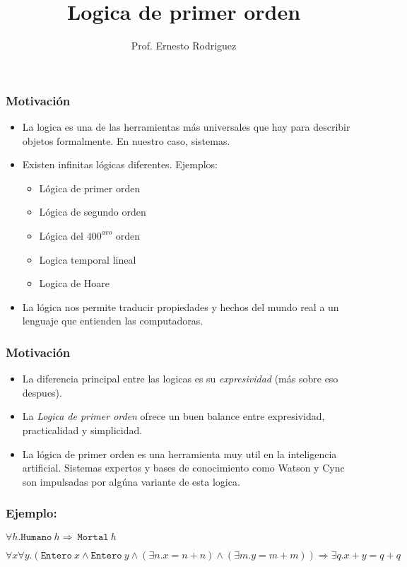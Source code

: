 \documentclass{beamer}
\title{Logica de primer orden}
\author{Prof. Ernesto Rodriguez}
\institute{
    Universidad del Itsmo \\
    \medskip \textit{erodriguez@unis.edu.gt}
}
\date[\today]{}
\begin{document}
\begin{frame}
\titlepage
\end{frame}

\begin{frame}
    \frametitle{Motivaci\'on}
    \begin{itemize}
        \item{La logica es una de las herramientas m\'as universales que hay
        para describir objetos formalmente. En nuestro caso, sistemas.}
        \item{Existen infinitas l\'ogicas diferentes. Ejemplos:
            \begin{itemize}
                \item{L\'ogica de primer orden}
                \item{L\'ogica de segundo orden}
                \item{L\'ogica del $400^{avo}$ orden}
                \item{Logica temporal lineal}
                \item{Logica de Hoare}
            \end{itemize}
        }
        \item{La l\'ogica nos permite traducir propiedades y hechos del
        mundo real a un lenguaje que entienden las computadoras.}
    \end{itemize}
\end{frame}

\begin{frame}
    \frametitle{{Motivaci\'on}}
    \begin{itemize}
        \item{La diferencia principal entre las logicas es su \emph{expresividad}
        (m\'as sobre eso despues).}
        \item{La \emph{Logica de primer orden} ofrece un buen balance
            entre expresividad, practicalidad y simplicidad.}
        \item{La l\'ogica de primer orden es una herramienta muy util en la inteligencia
            artificial. Sistemas expertos y bases de conocimiento como Watson y Cync son
            impulsadas por alg\'una variante de esta logica.}
    \end{itemize}
\end{frame}

\begin{frame}
    \frametitle{Ejemplo:}
    \begin{center}
        $\forall h.\mathtt{Humano}\ h \Rightarrow\ \mathtt{Mortal}\ h$
    \end{center}
    \begin{center}
        $\forall x\forall y.(\mathtt{Entero}\ x\wedge\mathtt{Entero}\ y\wedge(\exists n.x=n+n)\wedge(\exists m.y=m+m))\Rightarrow \exists q.x+y=q+q$
    \end{center}
\end{frame}
\end{document}
